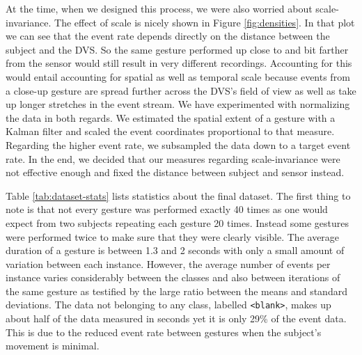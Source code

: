 At the time, when we designed this process, we were also worried about
scale-invariance. The effect of scale is nicely shown in Figure
\ref{fig:densities}. In that plot we can see that the event rate depends
directly on the distance between the subject and the DVS. So the same gesture
performed up close to and bit farther from the sensor would still result in very
different recordings. Accounting for this would entail accounting for spatial as
well as temporal scale because events from a close-up gesture are spread further
across the DVS's field of view as well as take up longer stretches in the event
stream. We have experimented with normalizing the data in both regards. We
estimated the spatial extent of a gesture with a Kalman filter and scaled the
event coordinates proportional to that measure. Regarding the higher event rate,
we subsampled the data down to a target event rate. In the end, we decided that
our measures regarding scale-invariance were not effective enough and fixed the
distance between subject and sensor instead.

Table \ref{tab:dataset-stats} lists statistics about the final dataset. The
first thing to note is that not every gesture was performed exactly 40 times as
one would expect from two subjects repeating each gesture 20 times. Instead some
gestures were performed twice to make sure that they were clearly visible. The
average duration of a gesture is between 1.3 and 2 seconds with only a small
amount of variation between each instance. However, the average number of events
per instance varies considerably between the classes and also between iterations
of the same gesture as testified by the large ratio between the means and
standard deviations. The data not belonging to any class, labelled
\texttt{<blank>}, makes up about half of the data measured in seconds yet it is
only 29\% of the event data. This is due to the reduced event rate between
gestures when the subject's movement is minimal.

